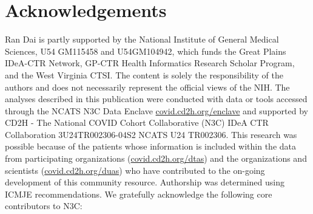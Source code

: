 \documentclass[11pt]{article}
\theoremstyle{plain}
\theoremstyle{definition}
\theoremstyle{remark}
\newcommand{\0}{\mathbf{0}}
\begin{document}
\section*{Acknowledgements}
Ran Dai is partly supported by the National Institute of General Medical Sciences, U54 GM115458 and U54GM104942, which funds the Great Plains IDeA-CTR Network, GP-CTR Health Informatics Research Scholar Program, and the West Virginia CTSI. The content is solely the responsibility of the authors and does not necessarily represent the official views of the NIH. The analyses described in this publication were conducted with data or tools accessed through the NCATS N3C Data Enclave \url{covid.cd2h.org/enclave} and supported by CD2H - The National COVID Cohort Collaborative (N3C) IDeA CTR Collaboration 3U24TR002306-04S2 NCATS U24 TR002306. This research was possible because of the patients whose information is included within the data from participating organizations (\url{covid.cd2h.org/dtas}) and the organizations and scientists (\url{covid.cd2h.org/duas}) who have contributed to the on-going development of this community resource\citep{Haendel-N3C}. Authorship was determined using ICMJE recommendations. We gratefully acknowledge the following core contributors to N3C:
\end{document}
